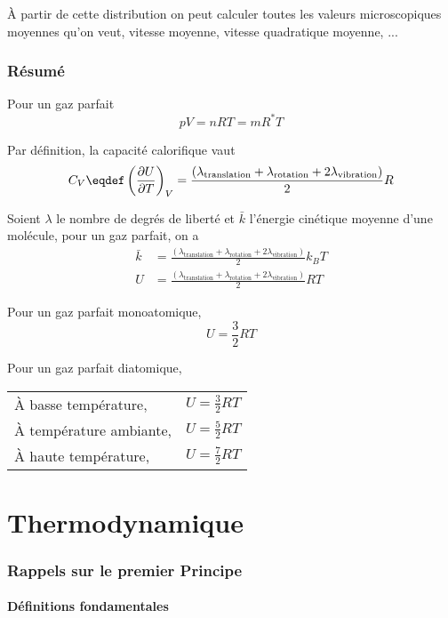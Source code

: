 À partir de cette distribution on peut calculer
toutes les valeurs microscopiques moyennes qu'on veut,
vitesse moyenne, vitesse quadratique moyenne, ...

\section{Résumé}

Pour un gaz parfait
\[ pV = nRT = mR^*T \]

Par définition, la capacité calorifique vaut
\[ C_V \eqdef \left(\fpart{U}{T}\right)_V
= \frac{(\lambda_\mathrm{translation} + \lambda_\mathrm{rotation} +
2\lambda_\mathrm{vibration})}{2}R \]

Soient $\lambda$ le nombre de degrés de liberté
et $\bar k$ l'énergie cinétique moyenne d'une molécule,
pour un gaz parfait, on a
\begin{align*}
  \bar k & = \frac{(\lambda_\mathrm{translation} + \lambda_\mathrm{rotation} +
  2\lambda_\mathrm{vibration})}{2}k_BT\\
  U & = \frac{(\lambda_\mathrm{translation} + \lambda_\mathrm{rotation} +
  2\lambda_\mathrm{vibration})}{2}RT
\end{align*}

Pour un gaz parfait monoatomique,
\[ U = \frac 32 RT \]

Pour un gaz parfait diatomique,
\begin{center}
  \begin{tabular}{|l|l|}
    \hline
    À basse température, &
    \( U = \frac 32 RT \)\\
    À température ambiante, &
    \( U = \frac 52 RT \)\\
    À haute température, &
    \( U = \frac 72 RT \)\\
    \hline
  \end{tabular}
\end{center}

\part{Thermodynamique}
\section{Rappels sur le premier Principe}
\subsection{Définitions fondamentales}

